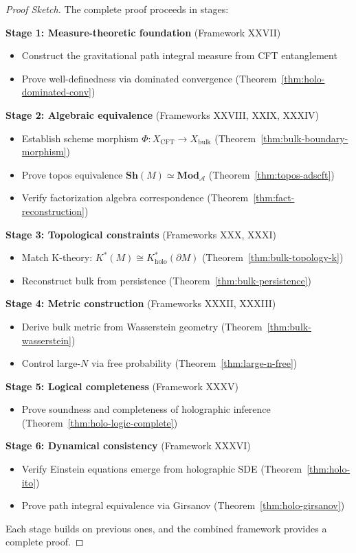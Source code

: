 \documentclass[12pt,a4paper]{article}
\begin{document}
\begin{proof}[Proof Sketch]
The complete proof proceeds in stages:

\textbf{Stage 1: Measure-theoretic foundation} (Framework XXVII)
\begin{itemize}
    \item Construct the gravitational path integral measure from CFT entanglement
    \item Prove well-definedness via dominated convergence (Theorem~\ref{thm:holo-dominated-conv})
\end{itemize}

\textbf{Stage 2: Algebraic equivalence} (Frameworks XXVIII, XXIX, XXXIV)
\begin{itemize}
    \item Establish scheme morphism $\Phi: X_{\text{CFT}} \to X_{\text{bulk}}$ (Theorem~\ref{thm:bulk-boundary-morphism})
    \item Prove topos equivalence $\mathbf{Sh}(M) \simeq \mathbf{Mod}_{\mathcal{A}}$ (Theorem~\ref{thm:topos-adscft})
    \item Verify factorization algebra correspondence (Theorem~\ref{thm:fact-reconstruction})
\end{itemize}

\textbf{Stage 3: Topological constraints} (Frameworks XXX, XXXI)
\begin{itemize}
    \item Match K-theory: $K^*(M) \cong K_{\text{holo}}^*(\partial M)$ (Theorem~\ref{thm:bulk-topology-k})
    \item Reconstruct bulk from persistence (Theorem~\ref{thm:bulk-persistence})
\end{itemize}

\textbf{Stage 4: Metric construction} (Frameworks XXXII, XXXIII)
\begin{itemize}
    \item Derive bulk metric from Wasserstein geometry (Theorem~\ref{thm:bulk-wasserstein})
    \item Control large-$N$ via free probability (Theorem~\ref{thm:large-n-free})
\end{itemize}

\textbf{Stage 5: Logical completeness} (Framework XXXV)
\begin{itemize}
    \item Prove soundness and completeness of holographic inference (Theorem~\ref{thm:holo-logic-complete})
\end{itemize}

\textbf{Stage 6: Dynamical consistency} (Framework XXXVI)
\begin{itemize}
    \item Verify Einstein equations emerge from holographic SDE (Theorem~\ref{thm:holo-ito})
    \item Prove path integral equivalence via Girsanov (Theorem~\ref{thm:holo-girsanov})
\end{itemize}

Each stage builds on previous ones, and the combined framework provides a complete proof.
\end{proof}
\end{document}

